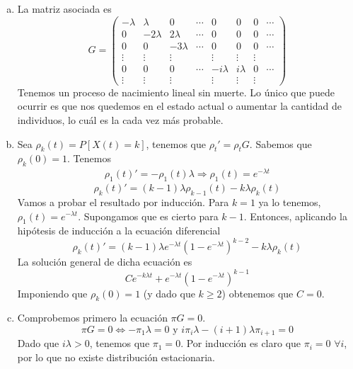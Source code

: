 \documentclass[twoside]{article}
\begin{document}
\begin{solucion}
\begin{enumerate}[a)]
\begin{center}
\end{center}
\item La matriz asociada es
$$
G= 
\begin{pmatrix}
-\lambda & \lambda & 0 &  \cdots & 0 & 0 & 0 & \cdots \\
0 & -2\lambda & 2\lambda &  \cdots& 0 & 0 & 0 &\cdots \\
0 & 0 & -3\lambda & \cdots & 0 & 0 & 0 &\cdots \\
\vdots & \vdots& \vdots & & \vdots & \vdots & \vdots\\
0 & 0 & 0 & \cdots & -i\lambda & i \lambda & 0 & \cdots\\
\vdots & \vdots & \vdots & & \vdots & \vdots & \vdots
\end{pmatrix}
$$
Tenemos un proceso de nacimiento lineal sin muerte. Lo único que puede ocurrir es que nos quedemos en el estado actual o aumentar la cantidad de individuos, lo cuál es la cada vez más probable.
\item Sea $\rho_k(t) = P[X(t)=k]$, tenemos que $\rho_t'=\rho_t G$. Sabemos que $\rho_k(0)=1$. Tenemos 
\begin{align*}
\rho_1(t)' = -\rho_1(t)\lambda \Rightarrow \rho_1(t)=e^{-\lambda t}
\end{align*}
$$
\rho_k(t)' = (k-1)\lambda\rho_{k-1}(t)-k\lambda\rho_k(t)
$$
Vamos a probar el resultado por inducción. Para $k=1$ ya lo tenemos, $\rho_1(t)=e^{-\lambda t}$. Supongamos que es cierto para $k-1$. Entonces, aplicando la hipótesis de inducción a la ecuación diferencial
$$
\rho_k(t)' = (k-1)\lambda e^{-\lambda t}(1-e^{-\lambda t})^{k-2}-k\lambda\rho_k(t)
$$
La solución general de dicha ecuación es
$$
Ce^{-k\lambda t} + e^{-\lambda t}(1-e^{-\lambda t})^{k-1}
$$
Imponiendo que $\rho_k(0)=1$ (y dado que $k\geq 2$) obtenemos que $C=0$. 
\item Comprobemos primero la ecuación $\pi G=0$.
$$
\pi G = 0 \Leftrightarrow -\pi_1 \lambda  = 0 \text{ y } i\pi_i \lambda - (i+1)\lambda \pi_{i+1} = 0
$$
Dado que $i\lambda > 0$, tenemos que $\pi_1 = 0$. Por inducción es claro que $\pi_i = 0$ $\forall i$, por lo que no existe distribución estacionaria.
\end{enumerate}
\end{solucion}
\end{document}
